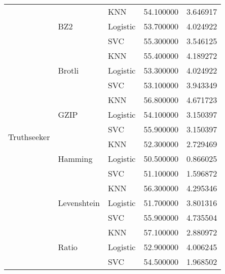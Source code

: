 {\begin{tabular}{lllll}
\multirow[t]{18}{*}{Truthseeker} & \multirow[t]{3}{*}{BZ2} & KNN & 54.100000 & 3.646917 \\
 &  & Logistic & 53.700000 & 4.024922 \\
 &  & SVC & 55.300000 & 3.546125 \\
\cline{2-5}
 & \multirow[t]{3}{*}{Brotli} & KNN & 55.400000 & 4.189272 \\
 &  & Logistic & 53.300000 & 4.024922 \\
 &  & SVC & 53.100000 & 3.943349 \\
\cline{2-5}
 & \multirow[t]{3}{*}{GZIP} & KNN & 56.800000 & 4.671723 \\
 &  & Logistic & 54.100000 & 3.150397 \\
 &  & SVC & 55.900000 & 3.150397 \\
\cline{2-5}
 & \multirow[t]{3}{*}{Hamming} & KNN & 52.300000 & 2.729469 \\
 &  & Logistic & 50.500000 & 0.866025 \\
 &  & SVC & 51.100000 & 1.596872 \\
\cline{2-5}
 & \multirow[t]{3}{*}{Levenshtein} & KNN & 56.300000 & 4.295346 \\
 &  & Logistic & 51.700000 & 3.801316 \\
 &  & SVC & 55.900000 & 4.735504 \\
\cline{2-5}
 & \multirow[t]{3}{*}{Ratio} & KNN & 57.100000 & 2.880972 \\
 &  & Logistic & 52.900000 & 4.006245 \\
 &  & SVC & 54.500000 & 1.968502 \\
\cline{1-5} \cline{2-5}
\bottomrule
\end{tabular}
}